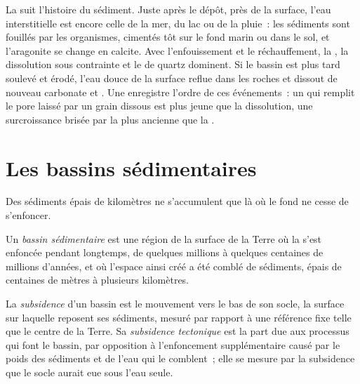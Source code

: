 La  suit l'histoire du sédiment. Juste après le dépôt, près de la
surface, l'eau interstitielle est encore celle de la mer, du lac ou de la pluie~:
les sédiments sont fouillés par les organismes, cimentés tôt sur le fond marin ou dans le sol, et
l'aragonite se change en calcite. Avec l'enfouissement et le réchauffement, la , la dissolution
sous contrainte et le  de quartz dominent. Si le bassin est
plus tard soulevé et érodé, l'eau douce de la surface reflue dans les
roches et dissout de nouveau carbonate et . Une  enregistre
l'ordre de ces événements~: un  qui remplit le pore laissé par un grain dissous est
plus jeune que la dissolution, une surcroissance brisée par la  plus ancienne que
la .

\section{Les bassins sédimentaires}\label{sec:b1:diagenesis-basins:basins}

Des sédiments épais de kilomètres ne s'accumulent que là où le fond ne cesse de s'enfoncer.

\begin{definition}\label{def:b1:diagenesis-basins:basin}
Un \emph{bassin sédimentaire} est une région de la
surface de la Terre où la  s'est enfoncée pendant longtemps, de quelques millions à quelques
centaines de millions d'années, et où l'espace ainsi créé a été comblé de
sédiments, épais de centaines de mètres à plusieurs kilomètres.
\end{definition}

\begin{definition}\label{def:b1:diagenesis-basins:subsidence}
La \emph{subsidence} d'un bassin est le mouvement vers le bas de son
socle, la surface sur laquelle reposent ses sédiments, mesuré par rapport à une
référence fixe telle que le centre de la Terre. Sa \emph{subsidence
tectonique} est la part due aux processus qui
font le bassin, par opposition à l'enfoncement supplémentaire causé par le poids des
sédiments et de l'eau qui le comblent~; elle se mesure par la subsidence que le socle
aurait eue sous l'eau seule.
\end{definition}

